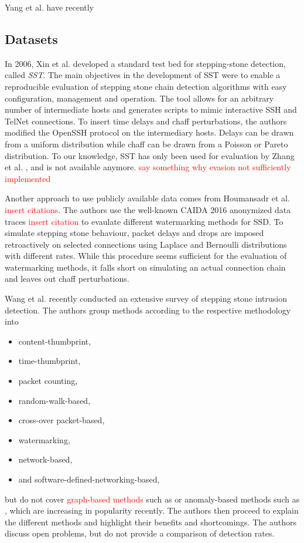 \documentclass[conference]{IEEEtran}\usepackage[]{graphicx}\usepackage[]{color}
\begin{document}
Yang et al. \cite{yang2018sniffing} have recently 

\subsection{Datasets}


In 2006, Xin et al. \cite{xin2006testbed} developed a standard test bed for stepping-stone detection, called \textit{SST}. 
The main objectives in the development of SST were to enable a reproducible evaluation of stepping stone chain detection algorithms with easy configuration, management and operation. The tool allows for an arbitrary number of intermediate hosts and generates scripts to mimic interactive SSH and TelNet connections. 
To insert time delays and chaff perturbations, the authors modified the OpenSSH protocol on the intermediary hosts. Delays can be drawn from a uniform distribution while chaff can be drawn from a Poisson or Pareto distribution. To our knowledge, SST has only been used for evaluation by Zhang et al. \cite{zhang2005stepping}, and is not available anymore. \textcolor{red}{say something why evasion not sufficiently implemented}

Another approach to use publicly available data comes from Houmansadr et al. \textcolor{red}{insert citations}. The authors use the well-known CAIDA 2016 anonymized data traces \textcolor{red}{insert citation} to evaulate different watermarking methods for SSD. To simulate stepping stone behaviour, packet delays and drops are imposed retroactively on selected connections using Laplace and Bernoulli distributions with different rates. While this procedure seems sufficient for the evaluation of watermarking methods, it falls short on simulating an actual connection chain and leaves out chaff perturbations. 


Wang et al. \cite{wang2018research} recently conducted an extensive survey of  stepping stone intrusion detection. The authors group methods according to the respective methodology into 
\begin{itemize}
\item content-thumbprint,
\item time-thumbprint,
\item packet counting,
\item random-walk-based,
\item cross-over packet-based,
\item watermarking,
\item network-based,
\item and software-defined-networking-based, 
\end{itemize} 
but do not cover \textcolor{red}{graph-based methods} such as \cite{gamarra2018analysis} %
or anomaly-based methods such as \cite{di2011detecting}, which are increasing in popularity recently.
The authors then proceed to explain the different methods and highlight their benefits and shortcomings. The authors discuss open problems, but do not provide a comparison of detection rates. 
\end{document}
